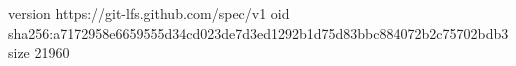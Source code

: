 version https://git-lfs.github.com/spec/v1
oid sha256:a7172958e6659555d34cd023de7d3ed1292b1d75d83bbc884072b2c75702bdb3
size 21960
